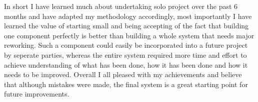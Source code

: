 \documentclass{l4proj}
\begin{document}
In short I have learned much about undertaking solo project over the past 6 months and have adapted my methodology accordingly, most importantly I have learned the value of starting small and being accepting of the fact that building one component perfectly is better than building a whole system that needs major reworking. Such a component could easily be incorporated into a future project by seperate parties, whereas the entire system required more time and effort to achieve understanding of what has been done, how it has been done and how it needs to be improved. Overall I all pleased with my achievements and believe that although mistakes were made, the final system is a great starting point for future improvements.

\begin{appendices}
\end{appendices}




\end{document}
